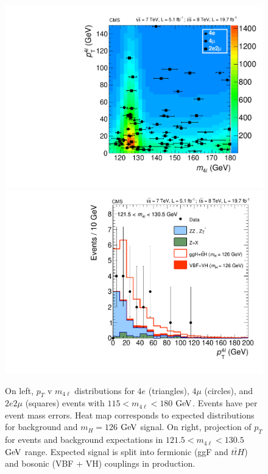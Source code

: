\begin{figure}[htbp]
\begin{center}
\includegraphics[width=.45\linewidth]{HiggsDiscovery/figures/M4l_vs_pT_all.pdf}
\includegraphics[width=.45\linewidth]{HiggsDiscovery/figures/PT01JetPeak.pdf}
\caption[Observed $p_T$ Distributions for Low Mass $4\ell$ Events With Signal Expectations]{On left, $p_T$ v $m_{4\ell}$ distributions for $4e$ (triangles), $4\mu$ (circles), and $2e2\mu$ (squares) events with $115 < m_{4\ell} < 180$ $\rm{GeV}$. Events have per event mass errors. Heat map corresponds to expected distributions for background and $m_H = 126$ $\rm{GeV}$ signal. On right, projection of $p_T$ for events and background expectations in $121.5 < m_{4\ell} < 130.5$ $\rm{GeV}$ range. Expected signal is split into fermionic (ggF and $t\bar{t}H$) and bosonic (VBF + VH) couplings in production.}
\label{fig:pT_Results}
\end{center}
\end{figure}

